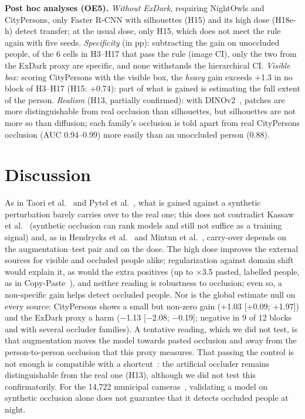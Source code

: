 \documentclass[conference]{IEEEtran}
\begin{document}
\textbf{Post hoc analyses (OE5).} \emph{Without ExDark}, requiring NightOwls and CityPersons, only Faster R-CNN with silhouettes (H15) and its high dose (H18e-h) detect transfer; at the usual dose, only H15, which does not meet the rule again with five seeds. \emph{Specificity} (in pp): subtracting the gain on unoccluded people, of the 6 cells in H3--H17 that pass the rule (image CI), only the two from the ExDark proxy are specific, and none withstands the hierarchical CI. \emph{Visible box:} scoring CityPersons with the visible box, the \emph{heavy} gain exceeds +1.3 in no block of H3--H17 (H15: +0.74): part of what is gained is estimating the full extent of the person. \emph{Realism} (H13, partially confirmed): with DINOv2~\cite{Oquab2024dinov2}, patches are more distinguishable from real occlusion than silhouettes, but silhouettes are not more so than diffusion; each family's occlusion is told apart from real CityPersons occlusion (AUC 0.94--0.99) more easily than an unoccluded person (0.88).

\section{Discussion}
As in Taori et al.~\cite{Taori2020shifts} and Pytel et al.~\cite{Pytel2021tilting}, what is gained against a synthetic perturbation barely carries over to the real one; this does not contradict Kassaw et al.~\cite{Kassaw2026occl} (synthetic occlusion can rank models and still not suffice as a training signal) and, as in Hendrycks et al.~\cite{Hendrycks2021manyfaces} and Mintun et al.~\cite{Mintun2021interaction}, carry-over depends on the augmentation--test pair and on the dose. The high dose improves the external sources for visible and occluded people alike; regularization against domain shift would explain it, as would the extra positives (up to $\times$3.5 pasted, labelled people, as in Copy-Paste~\cite{Ghiasi2021copypaste}), and neither reading is robustness to occlusion; even so, a non-specific gain helps detect occluded people. Nor is the global estimate null on every source: CityPersons shows a small but non-zero gain (+1.03 [+0.09; +1.97]) and the ExDark proxy a harm ($-$1.13 [$-$2.08; $-$0.19]; negative in 9 of 12 blocks and with several occluder families). A tentative reading, which we did not test, is that augmentation moves the model towards pasted occlusion and away from the person-to-person occlusion that this proxy measures. That passing the control is not enough is compatible with a shortcut~\cite{Geirhos2020shortcut}: the artificial occluder remains distinguishable from the real one (H13), although we did not test this confirmatorily. For the 14,722 municipal cameras~\cite{INEI2024renamu}, validating a model on synthetic occlusion alone does not guarantee that it detects occluded people at night.
\end{document}
